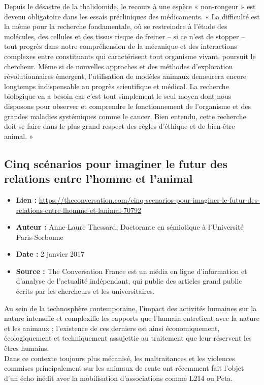 \documentclass[10pt]{article}
\begin{document}
 Depuis le désastre de la thalidomide, le recours à une espèce « non-rongeur » est devenu obligatoire dans les essais précliniques des médicaments. « La difficulté est la même pour la recherche fondamentale, où se restreindre à l’étude des molécules, des cellules et des tissus risque de freiner – si ce n’est de stopper – tout progrès dans notre compréhension de la mécanique et des interactions complexes entre constituants qui caractérisent tout organisme vivant, poursuit le chercheur. Même si de nouvelles approches et des méthodes d’exploration révolutionnaires émergent, l’utilisation de modèles animaux demeurera encore longtemps indispensable au progrès scientifique et médical. La recherche biologique en a besoin car c’est tout simplement le seul moyen dont nous disposons pour observer et comprendre le fonctionnement de l’organisme et des grandes maladies systémiques comme le cancer. Bien entendu, cette recherche doit se faire dans le plus grand respect des règles d’éthique et de bien-être animal. »
\newpage 

\subsection{Cinq scénarios pour imaginer le futur des relations entre l’homme et l’animal}
\begin{itemize}
	\item \textbf{Lien : }  \url{https://theconversation.com/cinq-scenarios-pour-imaginer-le-futur-des-relations-entre-lhomme-et-lanimal-70792} 
	\item \textbf{Auteur : } Anne-Laure Thessard, Doctorante en sémiotique à l'Université Paris-Sorbonne
	\item \textbf{Date : } 2 janvier 2017
	\item \textbf{Source : } The Conversation France est un média en ligne d'information et d'analyse de l'actualité indépendant, qui publie des articles grand public écrits par les chercheurs et les universitaires. 
\end{itemize}



Au sein de la technosphère contemporaine, l’impact des activités humaines sur la nature intensifie et complexifie les rapports que l’humain entretient avec la nature et les animaux ; l’existence de ces derniers est ainsi économiquement, écologiquement et techniquement assujettie au traitement que leur réservent les êtres humains. \\

Dans ce contexte toujours plus mécanisé, les maltraitances et les violences commises principalement sur les animaux de rente ont récemment fait l’objet d’un écho inédit avec la mobilisation d’associations comme L214 ou Peta.\\
\end{document}
